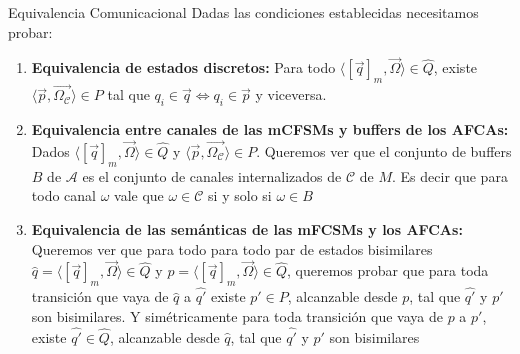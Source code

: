 \documentclass[10pt,xcolor={table,dvipsnames},t]{beamer}
\begin{document}
\begin{frame}{Equivalencia Comunicacional}
 \vspace{\fill}
Dadas las condiciones establecidas necesitamos probar:
\begin{enumerate}
    \item \textbf{Equivalencia de estados discretos:} Para todo $\langle [\overrightarrow{q}]_m, \overrightarrow{\Omega} \rangle \in \widehat{Q}$, existe $\langle \overrightarrow{p}, \overrightarrow{\Omega_{\mathcal{C}}} \rangle \in P$ tal que $q_i \in \overrightarrow{q} \iff q_i \in \overrightarrow{p}$ y viceversa.
    \item \textbf{Equivalencia entre canales de las mCFSMs y buffers de los AFCAs:} Dados $\langle [\overrightarrow{q}]_m, \overrightarrow{\Omega} \rangle \in \widehat{Q}$ y $\langle \overrightarrow{p}, \overrightarrow{\Omega_{\mathcal{C}}} \rangle \in P$. Queremos ver que el conjunto de buffers $B$ de $\mathcal{A}$ es el conjunto de canales internalizados de $\mathcal{C}$ de $M$. Es decir que para todo canal $\omega$ vale que $\omega \in \mathcal{C}$ si y solo si $\omega \in B$
    \item \textbf{Equivalencia de las semánticas de las mFCSMs y los AFCAs:} Queremos ver que para todo para todo par de estados bisimilares $\widehat{q}=\langle [\overrightarrow{q}]_m, \overrightarrow{\Omega} \rangle \in \widehat{Q}$ y $p=\langle [\overrightarrow{q}]_m, \overrightarrow{\Omega} \rangle \in \widehat{Q}$, queremos probar que para toda transición que vaya de $\widehat{q}$ a $\widehat{q'}$ existe $p' \in P$, alcanzable desde $p$, tal que $\widehat{q'}$ y $p'$ son bisimilares. Y simétricamente para toda transición que vaya de $p$ a $p'$, existe $\widehat{q'} \in \widehat{Q}$, alcanzable desde $\widehat{q}$, tal que $\widehat{q'}$ y $p'$ son bisimilares
\end{enumerate}
\end{frame}
\end{document}
